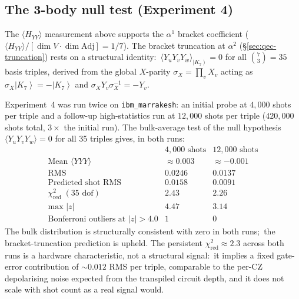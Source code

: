 \documentclass[11pt]{article}
\newcommand{\Adj}{\mathrm{Adj}}
\newcommand{\ket}[1]{\left|#1\right\rangle}
\begin{document}
\subsection{The 3-body null test (Experiment 4)}
\label{sec:heron-3body}

The $\langle H_{YY}\rangle$ measurement above supports the
$\alpha^1$ bracket coefficient ($\langle H_{YY}\rangle/[\dim V \cdot
\dim \Adj] = 1/7$).  The bracket truncation at $\alpha^2$
(\S\ref{sec:qec-truncation}) rests on a structural identity:\
$\langle Y_u Y_v Y_w\rangle_{\ket{K_7}} = 0$ for all $\binom{7}{3} = 35$
basis triples, derived from the global $X$-parity
$\sigma_X = \prod_v X_v$ acting as $\sigma_X\ket{K_7} = -\ket{K_7}$
and $\sigma_X Y_v \sigma_X^{-1} = -Y_v$.

Experiment~4 was run twice on \texttt{ibm\_marrakesh}: an initial
probe at $4{,}000$ shots per triple and a follow-up high-statistics
run at $12{,}000$ shots per triple ($420{,}000$ shots total, $3\times$
the initial run).  The bulk-average test of the null hypothesis
$\langle Y_uY_vY_w\rangle = 0$ for all 35 triples gives, in both
runs:
\begin{equation}
  \label{eq:exp4-bulk-null}
  \begin{array}{l|cc}
                            & 4{,}000\text{ shots} & 12{,}000\text{ shots} \\\hline
    \text{Mean }\langle YYY\rangle & \approx 0.003 & \approx -0.001 \\
    \text{RMS}              & 0.0246 & 0.0137 \\
    \text{Predicted shot RMS} & 0.0158 & 0.0091 \\
    \chi^2_{\text{red}}\;(35\text{ dof}) & 2.43 & 2.26 \\
    \text{max }|z|          & 4.47 & 3.14 \\
    \text{Bonferroni outliers at }|z|>4.0 & 1 & 0
  \end{array}
\end{equation}
The bulk distribution is structurally consistent with zero in both
runs;\ the bracket-truncation prediction is upheld.  The persistent
$\chi^2_{\text{red}} \approx 2.3$ across both runs is a hardware
characteristic, not a structural signal:\ it implies a fixed
gate-error contribution of $\sim 0.012$ RMS per triple, comparable
to the per-CZ depolarising noise expected from the transpiled circuit
depth, and it does not scale with shot count as a real signal would.
\end{document}
